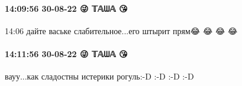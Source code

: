  
 
 
 
 

\paragraph{14:09:56 30-08-22 😜 𝕋𝔸ᗯ𝔸 😘}
14:06
дайте ваське слабительное...его штырит прям😂 😂 😂 😂

\paragraph{14:11:56 30-08-22 😜 𝕋𝔸ᗯ𝔸 😘}

вауу...как сладостны истерики рогуль:-D :-D :-D :-D
